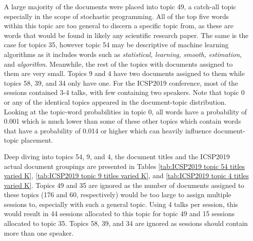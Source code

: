 \documentclass[a4paper, 12pt, twoside]{article}
\numberwithin{equation}{section} %
\begin{document}
A large majority of the documents were placed into topic 49, a catch-all topic especially in the scope of stochastic programming. All of the top five words within this topic are too general to discern a specific topic from, as these are words that would be found in likely any scientific research paper. The same is the case for topics 35, however topic 54 may be descriptive of machine learning algorithms as it includes words such as \textit{statistical, learning, smooth, estimation}, and \textit{algorithm}. Meanwhile, the rest of the topics with documents assigned to them are very small. Topics 9 and 4 have two documents assigned to them while topics 58, 39, and 34 only have one. For the ICSP2019 conference, most of the sessions contained 3-4 talks, with few containing two speakers. Note that topic 0 or any of the identical topics appeared in the document-topic distribution. Looking at the topic-word probabilities in topic 0, all words have a probability of 0.001 which is much lower than some of these other topics which contain words that have a probability of 0.014 or higher which can heavily influence document-topic placement.

Deep diving into topics 54, 9, and 4, the document titles and the ICSP2019 actual document groupings are presented in Tables \ref{tab:ICSP2019 topic 54 titles varied K}, \ref{tab:ICSP2019 topic 9 titles varied K}, and \ref{tab:ICSP2019 topic 4 titles varied K}. Topics 49 and 35 are ignored as the number of documents assigned to these topics (176 and 60, respectively) would be too large to assign multiple sessions to, especially with such a general topic. Using 4 talks per session, this would result in 44 sessions allocated to this topic for topic 49 and 15 sessions allocated to topic 35. Topics 58, 39, and 34 are ignored as sessions should contain more than one speaker. 
\end{document}
